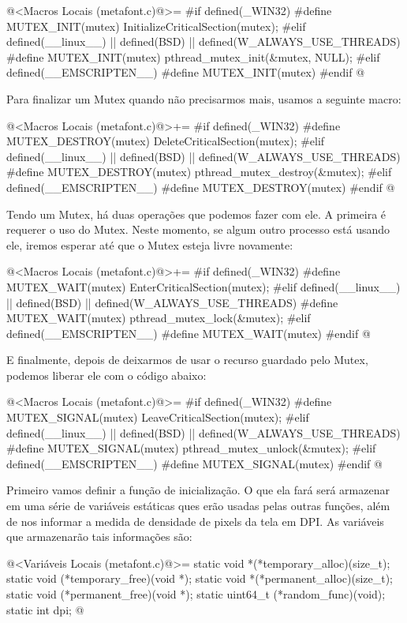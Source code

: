 \iniciocodigo
@<Macros Locais (metafont.c)@>=
#if defined(_WIN32)
#define MUTEX_INIT(mutex) InitializeCriticalSection(mutex);
#elif defined(__linux__) || defined(BSD) || defined(W_ALWAYS_USE_THREADS)
#define MUTEX_INIT(mutex) pthread_mutex_init(&mutex, NULL);
#elif defined(__EMSCRIPTEN__)
#define MUTEX_INIT(mutex)
#endif
@
\fimcodigo

Para finalizar um Mutex quando não precisarmos mais, usamos a seguinte
macro:

\iniciocodigo
@<Macros Locais (metafont.c)@>+=
#if defined(_WIN32)
#define MUTEX_DESTROY(mutex) DeleteCriticalSection(mutex);
#elif defined(__linux__) || defined(BSD) || defined(W_ALWAYS_USE_THREADS)
#define MUTEX_DESTROY(mutex) pthread_mutex_destroy(&mutex);
#elif defined(__EMSCRIPTEN__)
#define MUTEX_DESTROY(mutex)
#endif
@
\fimcodigo

Tendo um Mutex, há duas operações que podemos fazer com ele. A
primeira é requerer o uso do Mutex. Neste momento, se algum outro
processo está usando ele, iremos esperar até que o Mutex esteja livre
novamente:

\iniciocodigo
@<Macros Locais (metafont.c)@>+=
#if defined(_WIN32)
#define MUTEX_WAIT(mutex) EnterCriticalSection(mutex);
#elif defined(__linux__) || defined(BSD) || defined(W_ALWAYS_USE_THREADS)
#define MUTEX_WAIT(mutex) pthread_mutex_lock(&mutex);
#elif defined(__EMSCRIPTEN__)
#define MUTEX_WAIT(mutex)
#endif
@
\fimcodigo

E finalmente, depois de deixarmos de usar o recurso guardado pelo
Mutex, podemos liberar ele com o código abaixo:

\iniciocodigo
@<Macros Locais (metafont.c)@>=
#if defined(_WIN32)
#define MUTEX_SIGNAL(mutex) LeaveCriticalSection(mutex);
#elif defined(__linux__) || defined(BSD) || defined(W_ALWAYS_USE_THREADS)
#define MUTEX_SIGNAL(mutex) pthread_mutex_unlock(&mutex);
#elif defined(__EMSCRIPTEN__)
#define MUTEX_SIGNAL(mutex)
#endif
@
\fimcodigo



Primeiro vamos definir a função de inicialização. O que ela fará será
armazenar em uma série de variáveis estáticas ques erão usadas pelas
outras funções, além de nos informar a medida de densidade de pixels
da tela em DPI. As variáveis que armazenarão tais informações são:

\iniciocodigo
@<Variáveis Locais (metafont.c)@>=
static void *(*temporary_alloc)(size_t);
static void (*temporary_free)(void *);
static void *(*permanent_alloc)(size_t);
static void (*permanent_free)(void *);
static uint64_t (*random_func)(void);
static int dpi;
@
\fimcodigo


